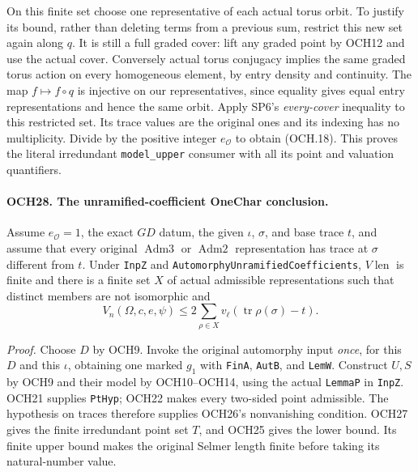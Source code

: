\documentclass[11pt,a4paper]{article}
\numberwithin{equation}{section}
\theoremstyle{remark}\newtheorem{remark}[theorem]{Remark}
\begin{document}
On this finite set choose one representative of each actual torus
orbit.  To justify its bound, rather than deleting terms from a
previous sum, restrict this new set again along \(q\).
It is still a full graded cover: lift any graded point by OCH12
and use the actual cover.  Conversely actual torus conjugacy
implies the same graded torus action on every homogeneous element,
by entry density and continuity.  The map \(f\mapsto f\circ q\)
is injective on our representatives, since equality gives equal
entry representations and hence the same orbit.  Apply SP6's
\emph{every-cover} inequality to this restricted set.  Its trace
values are the original ones and its indexing has no multiplicity.
Divide by the positive integer \(e_{\mathcal O}\) to obtain
(OCH.18).  This proves the literal irredundant \texttt{model\_\allowbreak upper}
consumer with all its point and valuation quantifiers.

\paragraph{OCH28. The unramified-coefficient OneChar conclusion.}
\label{claim:OCH28}
Assume \(e_{\mathcal O}=1\), the exact \(GD\) datum, the
given \(\iota\), \(\sigma\), and base trace \(t\), and
assume that every original \(\operatorname{Adm3}\) or
\(\operatorname{Adm2}\) representation has trace at
\(\sigma\) different from \(t\).  Under \texttt{Inp\allowbreak Z} and
\texttt{Automorphy\allowbreak Unramified\allowbreak Coefficients}, \(V\!\operatorname{len}\)
is finite and there is a finite set \(X\) of actual admissible
representations such that distinct members are not isomorphic and
\[
             V_n(\Omega,c,e,\psi)
                \le2\sum_{\rho\in X}
                       v_\ell(\operatorname{tr}\rho(\sigma)-t).
 \tag{OCH.19}
\]

\emph{Proof.}
Choose \(D\) by OCH9.  Invoke the original automorphy input
\emph{once}, for this \(D\) and this \(\iota\), obtaining
one marked \(g_1\) with \texttt{Fin\allowbreak A}, \texttt{Aut\allowbreak B}, and
\texttt{Lem\allowbreak W}.  Construct \(U,S\) by OCH9 and their model
by OCH10--OCH14, using the actual \texttt{Lemma\allowbreak P} in
\texttt{Inp\allowbreak Z}.  OCH21 supplies \texttt{Pt\allowbreak Hyp}; OCH22 makes
every two-sided point admissible.  The hypothesis on traces
therefore supplies OCH26's nonvanishing condition.
OCH27 gives the finite irredundant point set \(T\), and OCH25
gives the lower bound.  Its finite upper bound makes the original
Selmer length finite before taking its natural-number value.
\end{document}
